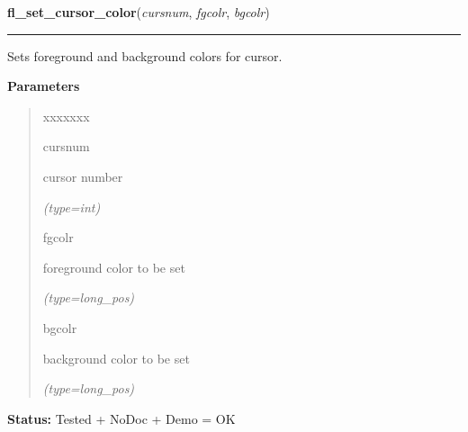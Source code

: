 \hspace{.8\funcindent}\begin{boxedminipage}{\funcwidth}

    \raggedright \textbf{fl\_set\_cursor\_color}(\textit{cursnum}, \textit{fgcolr}, \textit{bgcolr})

    \vspace{-1.5ex}

    \rule{\textwidth}{0.5\fboxrule}
\setlength{\parskip}{2ex}
    Sets foreground and background colors for cursor.

\setlength{\parskip}{1ex}
      \textbf{Parameters}
      \vspace{-1ex}

      \begin{quote}
        \begin{Ventry}{xxxxxxx}

          \item[cursnum]

          cursor number

            {\it (type=int)}

          \item[fgcolr]

          foreground color to be set

            {\it (type=long\_pos)}

          \item[bgcolr]

          background color to be set

            {\it (type=long\_pos)}

        \end{Ventry}

      \end{quote}

\textbf{Status:} Tested + NoDoc + Demo = OK



    \end{boxedminipage}

    \label{xformslib:flcursor:fl_create_bitmap_cursor}

    \vspace{0.5ex}


